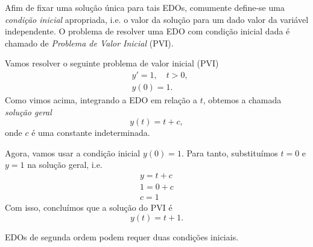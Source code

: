 Afim de fixar uma solução única para tais EDOs, comumente define-se uma \emph{condição inicial} apropriada, i.e. o valor da solução para um dado valor da variável independente. O problema de resolver uma EDO com condição inicial dada é chamado de \emph{Problema de Valor Inicial} (PVI).

\begin{ex}
  Vamos resolver o seguinte problema de valor inicial (PVI)
  \begin{align}
    &y' = 1,\quad t>0,\\
    &y(0)=1.
  \end{align}
  Como vimos acima, integrando a EDO em relação a $t$, obtemos a chamada \emph{solução geral}
  \begin{equation}
    y(t) = t + c,
  \end{equation}
  onde $c$ é uma constante indeterminada.

  Agora, vamos usar a condição inicial $y(0)=1$. Para tanto, substituímos $t=0$ e $y=1$ na solução geral, i.e.
  \begin{gather}
    y = t + c\\
    1 = 0 + c\\
    c = 1
  \end{gather}
  Com isso, concluímos que a solução do PVI é
  \begin{equation}
    y(t) = t + 1.
  \end{equation}
\end{ex}


EDOs de segunda ordem podem requer duas condições iniciais.

